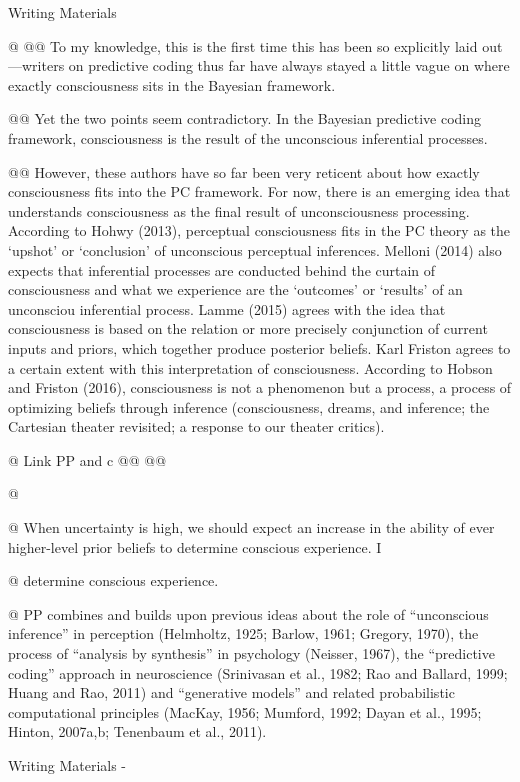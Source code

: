 \documentclass[utf8]{article}
\newenvironment{WritingMaterials} %
    	{
            \begin{tcolorbox}[enhanced,
                title=-,
                size=small,
                colbacktitle=Aquamarine,
                drop fuzzy shadow,
                fontupper=\small,
                boxrule=0.4pt,
                colback=Aquamarine!10!white,
                sharp corners]
                Writing Materials
            \end{tcolorbox}
            \begin{easylist}[itemize]
    	}
    	{
            \end{easylist}  
            \begin{tcolorbox}[enhanced,
                halign=flush right,
                halign title=right,
                size=small,
                colbacktitle=Aquamarine,
                drop fuzzy shadow,
                fontupper=\small,
                boxrule=0.4pt,
                colback=Aquamarine,
                colupper=White,
                sharp corners]
                Writing Materials -
            \end{tcolorbox}        
    	}
\begin{document}
			\begin{WritingMaterials}

				@ \cite{lamme2015predictive}
					@@ To my knowledge, this is the first time this has been so explicitly laid out—writers on predictive coding thus far have always stayed a little vague on where exactly consciousness sits in the Bayesian framework.

					@@ Yet the two points seem contradictory. In the Bayesian predictive coding framework, consciousness is the result of the unconscious inferential processes.


					@@ However, these authors have so far been very reticent about how exactly consciousness ﬁts into the PC framework. For now, there is an emerging idea that understands consciousness as the ﬁnal result of unconsciousness processing. According to Hohwy (2013), perceptual consciousness ﬁts in the PC theory as the ‘upshot’ or ‘conclusion’ of unconscious perceptual inferences. Melloni (2014) also expects that inferential processes are conducted behind the curtain of consciousness and what we experience are the ‘outcomes’ or ‘results’ of an unconsciou inferential process. Lamme (2015) agrees with the idea that consciousness is based on the relation or more precisely conjunction of current inputs and priors, which together produce posterior beliefs. Karl Friston agrees to a certain extent with this interpretation of consciousness. According to Hobson and Friston (2016), consciousness is not a phenomenon but a process, a process of optimizing beliefs through inference (consciousness, dreams, and inference; the Cartesian theater revisited; a response to our theater critics).


				@ Link PP and c
					@@ \cite{hobson2016response}
					@@ \cite{Melloni2015}

				@ \cite{SethPP2014}

				@ When uncertainty is high, we should expect an increase in the ability of ever higher-level prior beliefs to determine conscious experience. I

				@ determine conscious experience.

				@ PP combines and builds upon previous ideas about the role of “unconscious inference” in perception (Helmholtz, 1925; Barlow, 1961; Gregory, 1970), the process of “analysis by synthesis” in psychology (Neisser, 1967), the “predictive coding” approach in neuroscience (Srinivasan et al., 1982; Rao and Ballard, 1999; Huang and Rao, 2011) and “generative models” and related probabilistic computational principles (MacKay, 1956; Mumford, 1992; Dayan et al., 1995; Hinton, 2007a,b; Tenenbaum et al., 2011).



\end{WritingMaterials}
\end{document}
